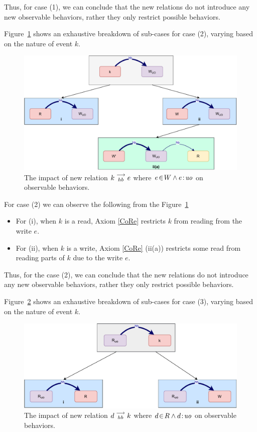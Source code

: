     Thus, for case (1), we can conclude that the new relations do not introduce any new observable behaviors, rather they only restrict possible behaviors.
    
    Figure~\ref{reord:case2} shows an exhaustive breakdown of sub-cases for case (2), varying based
    on the nature of event $k$.
    \begin{figure}[H]
        \centering
        \includegraphics[scale=0.6]{4.InstructionReordering/4.ValidReorderingCandidate/ProofParts/Part4/part4(b).pdf}
        \caption{The impact of new relation $k\stackrel{\longrightarrow}{_{hb}}e$ where $e\!\in\!W \wedge e\!:\!\textit{uo}$ on observable behaviors.}
        \label{reord:case2}
    \end{figure}
          
    For case (2) we can observe the following from the Figure~\ref{reord:case2} 
    \begin{itemize}
        \item For (i), when $k$ is a read, Axiom \ref{CoRe} restricts $k$ from reading from the write $e$. 
        \item For (ii), when $k$ is a write, Axiom \ref{CoRe} (ii(a)) restricts some read from reading parts of $k$ due to the write $e$.   
    \end{itemize}

    Thus, for the case (2), we can conclude that the new relations do not introduce any new observable behaviors, rather they only restrict possible behaviors.
    
    Figure~\ref{reord:case3} shows an exhaustive breakdown of sub-cases for case (3), varying based on the nature of event $k$.
    \begin{figure}[H]
        \centering
        \includegraphics[scale=0.6]{4.InstructionReordering/4.ValidReorderingCandidate/ProofParts/Part4/part4(c).pdf}
        \caption{The impact of new relation $d\stackrel{\longrightarrow}{_{hb}}k$ where $d\!\in\!R \wedge d\!:\!\textit{uo}$ on observable behaviors.}
        \label{reord:case3}
    \end{figure}
    
